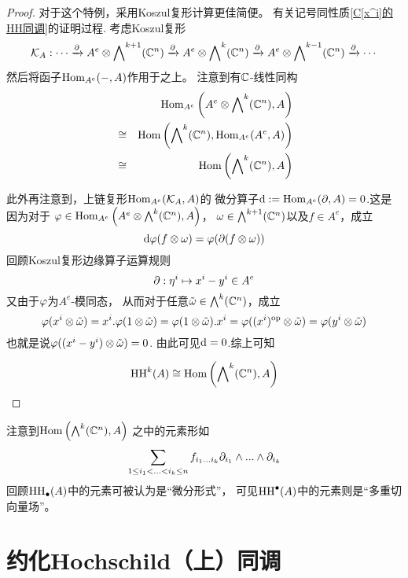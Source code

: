 \begin{proof}
对于这个特例，采用Koszul复形计算更佳简便。
有关记号同性质\ref{C[x^i]的HH同调}的证明过程.
考虑Koszul复形
$$
\mathcal{K}_A:\cdots
\xrightarrow{\partial}A^e\otimes\bigwedge\nolimits^{k+1}(\mathbb{C}^n)
\xrightarrow{\partial}A^e\otimes\bigwedge\nolimits^{k}(\mathbb{C}^n)
\xrightarrow{\partial}A^e\otimes\bigwedge\nolimits^{k-1}(\mathbb{C}^n)
\xrightarrow{\partial}\cdots
$$
然后将函子$\operatorname{Hom}_{A^e}(-,A)$作用于之上。
注意到有$\mathbb{C}$-线性同构
\begin{eqnarray*}
&&      \operatorname{Hom}_{A^e}\left(A^e\otimes\bigwedge\nolimits^{k}(\mathbb{C}^n),A\right)\\
&\cong& \operatorname{Hom}\left(\bigwedge\nolimits^{k}(\mathbb{C}^n),\operatorname{Hom}_{A^e}(A^e,A)\right)\\
&\cong& \operatorname{Hom}\left(\bigwedge\nolimits^{k}(\mathbb{C}^n),A\right)
\end{eqnarray*}

此外再注意到，上链复形$\operatorname{Hom}_{A^e}(\mathcal{K}_A,A)$的
微分算子$\mathrm{d}:=\operatorname{Hom}_{A^e}(\partial,A)=0$.这是因为对于
$\varphi\in\operatorname{Hom}_{A^e}\left(A^e\otimes\bigwedge\nolimits^{k}(\mathbb{C}^n),A\right)$，
$\omega\in\bigwedge\nolimits^{k+1}(\mathbb{C}^n)$以及$f\in A^e$，成立
$$\mathrm{d}\varphi(f\otimes\omega)=\varphi(\partial(f\otimes\omega))$$
回顾Koszul复形边缘算子运算规则
$$\partial:\eta^i\mapsto x^i-y^i\in A^e$$
又由于$\varphi$为$A^e$-模同态，
从而对于任意$\tilde{\omega}\in\bigwedge\nolimits^{k}(\mathbb{C}^n)$，成立
$$
\varphi(x^i\otimes\tilde{\omega})
=x^i.\varphi(1\otimes\tilde{\omega})
=\varphi(1\otimes\tilde{\omega}).x^i
=\varphi((x^i)^{\text{op}}\otimes\tilde{\omega})
=\varphi(y^i\otimes\tilde{\omega})$$
也就是说$\varphi((x^i-y^i)\otimes\tilde{\omega})=0$.
由此可见$\mathrm{d}=0$.综上可知

$$\operatorname{HH}^k(A)\cong
\operatorname{Hom}\left(\bigwedge\nolimits^{k}(\mathbb{C}^n),A\right)$$

\end{proof}

注意到$\operatorname{Hom}\left(\bigwedge\nolimits^{k}(\mathbb{C}^n),A\right)$
之中的元素形如
$$
\sum_{1\leq i_1<...<i_k\leq n}
f_{i_1...i_k}\partial_{i_1}\wedge...\wedge\partial_{i_k}
$$
回顾$\operatorname{HH}_{\bullet}(A)$中的元素可被认为是“微分形式”，
可见$\operatorname{HH}^{\bullet}(A)$中的元素则是“多重切向量场”。


\section{约化Hochschild（上）同调}

